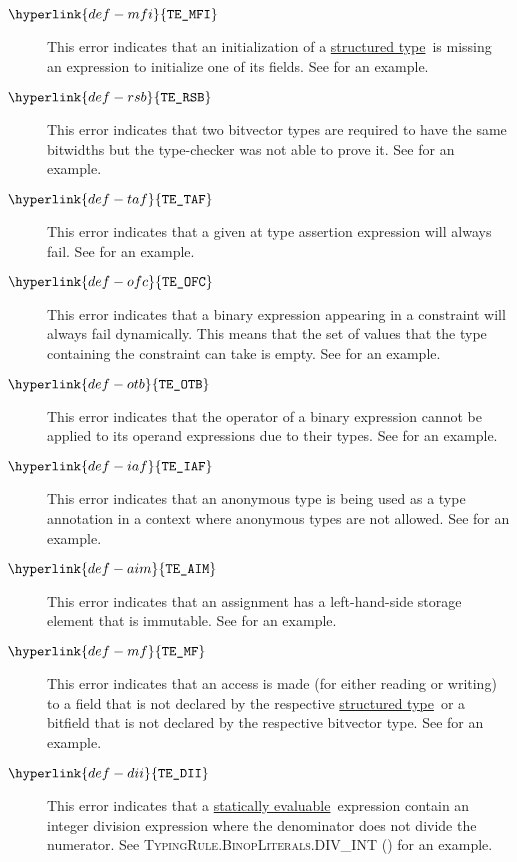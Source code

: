 \documentclass{book}
\newcommand\structuredtype[0]{\hyperlink{def-structuredtype}{structured type}}
\newcommand\staticallyevaluable[0]{\hyperlink{def-staticallyevaluable}{statically evaluable}}
\newcommand\TypeErrorCode[1]{\texttt{TE\_#1}}
\newcommand\MissingFieldInitializer[0]{\hyperlink{def-mfi}{\TypeErrorCode{MFI}}}
\newcommand\RequireSameBitwidths[0]{\hyperlink{def-rsb}{\TypeErrorCode{RSB}}}
\newcommand\TypeAsssertionFails[0]{\hyperlink{def-taf}{\TypeErrorCode{TAF}}}
\newcommand\BinaryOperationFailsAllConstraints[0]{\hyperlink{def-ofc}{\TypeErrorCode{OFC}}}
\newcommand\InvalidOperandTypesForBinop[0]{\hyperlink{def-otb}{\TypeErrorCode{OTB}}}
\newcommand\AnnonymousFormNotAllowedHere[0]{\hyperlink{def-iaf}{\TypeErrorCode{IAF}}}
\newcommand\AssignmentToImmutable[0]{\hyperlink{def-aim}{\TypeErrorCode{AIM}}}
\newcommand\MissingField[0]{\hyperlink{def-mf}{\TypeErrorCode{MF}}}
\newcommand\DivIntIndivisible[0]{\hyperlink{def-dii}{\TypeErrorCode{DII}}}
\begin{document}
\begin{description}
\hypertarget{def-mfi}{}
\item[$\MissingFieldInitializer$]
This error indicates that an initialization of a \structuredtype\ is missing an expression to initialize
one of its fields.
See  for an example.

\hypertarget{def-rsb}{}
\item[$\RequireSameBitwidths$]
This error indicates that two bitvector types are required to have the same bitwidths but the type-checker
was not able to prove it.
See  for an example.

\hypertarget{def-taf}{}
\item[$\TypeAsssertionFails$]
This error indicates that a given at type assertion expression will always fail.
See  for an example.

\hypertarget{def-ofc}{}
\item[$\BinaryOperationFailsAllConstraints$]
This error indicates that a binary expression appearing in a constraint will always fail dynamically.
This means that the set of values that the type containing
the constraint can take is empty.
See  for an example.

\hypertarget{def-otb}{}
\item[$\InvalidOperandTypesForBinop$]
This error indicates that the operator of a binary expression cannot be applied to its operand expressions
due to their types.
See  for an example.

\hypertarget{def-iaf}{}
\item[$\AnnonymousFormNotAllowedHere$]
This error indicates that an anonymous type is being used as a type annotation in a context
where anonymous types are not allowed.
See  for an example.

\hypertarget{def-aim}{}
\item[$\AssignmentToImmutable$]
This error indicates that an assignment has a left-hand-side storage element that is immutable.
See  for an example.

\hypertarget{def-mf}{}
\item[$\MissingField$]
This error indicates that an access is made (for either reading or writing) to a field that is
not declared by the respective \structuredtype\ or a bitfield that is not declared by the respective
bitvector type.
See  for an example.

\hypertarget{def-dii}{}
\item[$\DivIntIndivisible$]
This error indicates that a \staticallyevaluable\ expression contain an integer division expression where
the denominator does not divide the numerator.
See \textsc{TypingRule.BinopLiterals.DIV\_INT} () for an example.

\end{description}



\end{document}
